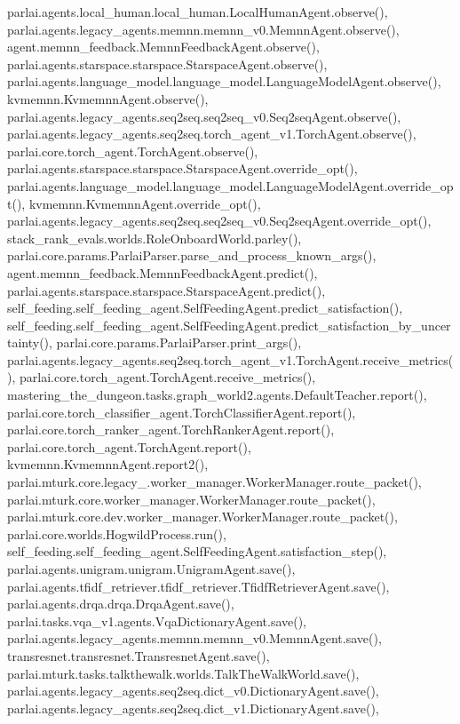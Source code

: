 parlai.\+agents.\+local\+\_\+human.\+local\+\_\+human.\+Local\+Human\+Agent.\+observe(), parlai.\+agents.\+legacy\+\_\+agents.\+memnn.\+memnn\+\_\+v0.\+Memnn\+Agent.\+observe(), agent.\+memnn\+\_\+feedback.\+Memnn\+Feedback\+Agent.\+observe(), parlai.\+agents.\+starspace.\+starspace.\+Starspace\+Agent.\+observe(), parlai.\+agents.\+language\+\_\+model.\+language\+\_\+model.\+Language\+Model\+Agent.\+observe(), kvmemnn.\+Kvmemnn\+Agent.\+observe(), parlai.\+agents.\+legacy\+\_\+agents.\+seq2seq.\+seq2seq\+\_\+v0.\+Seq2seq\+Agent.\+observe(), parlai.\+agents.\+legacy\+\_\+agents.\+seq2seq.\+torch\+\_\+agent\+\_\+v1.\+Torch\+Agent.\+observe(), parlai.\+core.\+torch\+\_\+agent.\+Torch\+Agent.\+observe(), parlai.\+agents.\+starspace.\+starspace.\+Starspace\+Agent.\+override\+\_\+opt(), parlai.\+agents.\+language\+\_\+model.\+language\+\_\+model.\+Language\+Model\+Agent.\+override\+\_\+opt(), kvmemnn.\+Kvmemnn\+Agent.\+override\+\_\+opt(), parlai.\+agents.\+legacy\+\_\+agents.\+seq2seq.\+seq2seq\+\_\+v0.\+Seq2seq\+Agent.\+override\+\_\+opt(), stack\+\_\+rank\+\_\+evals.\+worlds.\+Role\+Onboard\+World.\+parley(), parlai.\+core.\+params.\+Parlai\+Parser.\+parse\+\_\+and\+\_\+process\+\_\+known\+\_\+args(), agent.\+memnn\+\_\+feedback.\+Memnn\+Feedback\+Agent.\+predict(), parlai.\+agents.\+starspace.\+starspace.\+Starspace\+Agent.\+predict(), self\+\_\+feeding.\+self\+\_\+feeding\+\_\+agent.\+Self\+Feeding\+Agent.\+predict\+\_\+satisfaction(), self\+\_\+feeding.\+self\+\_\+feeding\+\_\+agent.\+Self\+Feeding\+Agent.\+predict\+\_\+satisfaction\+\_\+by\+\_\+uncertainty(), parlai.\+core.\+params.\+Parlai\+Parser.\+print\+\_\+args(), parlai.\+agents.\+legacy\+\_\+agents.\+seq2seq.\+torch\+\_\+agent\+\_\+v1.\+Torch\+Agent.\+receive\+\_\+metrics(), parlai.\+core.\+torch\+\_\+agent.\+Torch\+Agent.\+receive\+\_\+metrics(), mastering\+\_\+the\+\_\+dungeon.\+tasks.\+graph\+\_\+world2.\+agents.\+Default\+Teacher.\+report(), parlai.\+core.\+torch\+\_\+classifier\+\_\+agent.\+Torch\+Classifier\+Agent.\+report(), parlai.\+core.\+torch\+\_\+ranker\+\_\+agent.\+Torch\+Ranker\+Agent.\+report(), parlai.\+core.\+torch\+\_\+agent.\+Torch\+Agent.\+report(), kvmemnn.\+Kvmemnn\+Agent.\+report2(), parlai.\+mturk.\+core.\+legacy\+\_.\+worker\+\_\+manager.\+Worker\+Manager.\+route\+\_\+packet(), parlai.\+mturk.\+core.\+worker\+\_\+manager.\+Worker\+Manager.\+route\+\_\+packet(), parlai.\+mturk.\+core.\+dev.\+worker\+\_\+manager.\+Worker\+Manager.\+route\+\_\+packet(), parlai.\+core.\+worlds.\+Hogwild\+Process.\+run(), self\+\_\+feeding.\+self\+\_\+feeding\+\_\+agent.\+Self\+Feeding\+Agent.\+satisfaction\+\_\+step(), parlai.\+agents.\+unigram.\+unigram.\+Unigram\+Agent.\+save(), parlai.\+agents.\+tfidf\+\_\+retriever.\+tfidf\+\_\+retriever.\+Tfidf\+Retriever\+Agent.\+save(), parlai.\+agents.\+drqa.\+drqa.\+Drqa\+Agent.\+save(), parlai.\+tasks.\+vqa\+\_\+v1.\+agents.\+Vqa\+Dictionary\+Agent.\+save(), parlai.\+agents.\+legacy\+\_\+agents.\+memnn.\+memnn\+\_\+v0.\+Memnn\+Agent.\+save(), transresnet.\+transresnet.\+Transresnet\+Agent.\+save(), parlai.\+mturk.\+tasks.\+talkthewalk.\+worlds.\+Talk\+The\+Walk\+World.\+save(), parlai.\+agents.\+legacy\+\_\+agents.\+seq2seq.\+dict\+\_\+v0.\+Dictionary\+Agent.\+save(), parlai.\+agents.\+legacy\+\_\+agents.\+seq2seq.\+dict\+\_\+v1.\+Dictionary\+Agent.\+save(), 